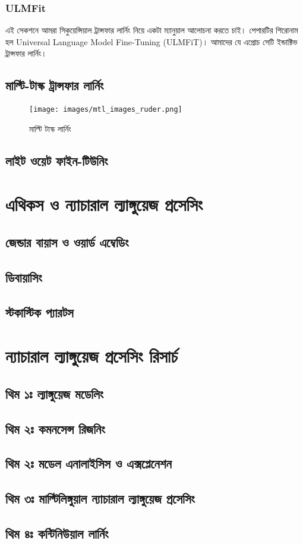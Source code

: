 \documentclass{book}
\begin{document}
\subsubsection{ULMFit} 
এই সেকশনে আমরা সিকুয়েন্সিয়াল ট্রান্সফার লার্নিং নিয়ে একটা ম্যানুয়াল আলোচনা করতে চাই। পেপারটির শিরোনাম হল Universal Language Model Fine-Tuning (ULMFiT)। আমাদের যে এপ্রোচ সেটি ইন্ডাক্টিভ ট্রান্সফার লার্নিং। 



\subsection{মাল্টি-টাস্ক ট্রান্সফার লার্নিং}

\begin{figure}[htbp] %
   \centering
   \texttt{[image: images/mtl\_images\_ruder.png]} 
   \caption{মাল্টি টাস্ক লার্নিং}
   \label{fig:ruder_mtl}
\end{figure} 
\subsection{লাইট ওয়েট ফাইন-টিউনিং}

\section{এথিকস ও ন্যাচারাল ল্যাঙ্গুয়েজ প্রসেসিং}
\subsection{জেন্ডার বায়াস ও ওয়ার্ড  এম্বেডিং}
\subsection{ডিবায়াসিং}
\subsection{স্টকাস্টিক প্যারটস}

\section{ন্যাচারাল ল্যাঙ্গুয়েজ প্রসেসিং রিসার্চ}
\subsection{থিম ১ঃ ল্যাঙ্গুয়েজ মডেলিং}
\subsection{থিম ২ঃ কমনসেন্স রিজনিং}
\subsection{থিম ২ঃ মডেল এনালাইসিস ও এক্সপ্লেনেশন}
\subsection{থিম ৩ঃ  মাল্টিলিঙ্গুয়াল ন্যাচারাল ল্যাঙ্গুয়েজ প্রসেসিং} 
\subsection{থিম ৪ঃ কন্টিনিউয়াল লার্নিং}




\end{document}
